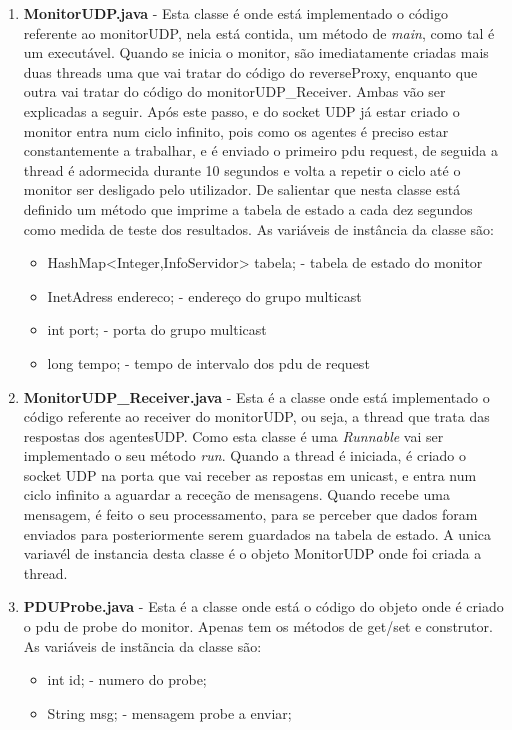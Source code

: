 \documentclass{llncs}
\begin{document}
\begin{enumerate}
				\bigskip
				\item \textbf{MonitorUDP.java} - Esta classe é onde está implementado o código referente ao monitorUDP, nela está contida, um método de \textit{main}, como tal é um executável. Quando se inicia o monitor, são imediatamente criadas mais duas threads uma que vai tratar do código do reverseProxy, enquanto que outra vai tratar do código do monitorUDP\_Receiver. Ambas vão ser explicadas a seguir. Após este passo, e do socket UDP já estar criado o monitor entra num ciclo infinito, pois como os agentes é preciso estar constantemente a trabalhar, e é enviado o primeiro pdu request, de seguida a thread é adormecida durante 10 segundos e volta a repetir o ciclo até o monitor ser desligado pelo utilizador. De salientar que nesta classe está definido um método que imprime a tabela de estado a cada dez segundos como medida de teste dos resultados. As variáveis de instância da classe são:
					\begin{itemize}
						\item{HashMap<Integer,InfoServidor> tabela;} - tabela de estado do monitor
						\item{InetAdress endereco;} - endereço do grupo multicast
						\item{int port;} - porta do grupo multicast
						\item{long tempo;} - tempo de intervalo dos pdu de request
					\end{itemize}

				\bigskip
				\item \textbf{MonitorUDP\_Receiver.java} - Esta é a classe onde está implementado o código referente ao receiver do monitorUDP, ou seja, a thread que trata das respostas dos agentesUDP. Como esta classe é uma \textit{Runnable} vai ser implementado o seu método \textit{run}. Quando a thread é iniciada, é criado o socket UDP na porta que vai receber as repostas em unicast, e entra num ciclo infinito a aguardar a receção de mensagens. Quando recebe uma mensagem, é feito o seu processamento, para se perceber que dados foram enviados para posteriormente serem guardados na tabela de estado.
				A unica variavél de instancia desta classe é o objeto MonitorUDP onde foi criada a thread.

				\bigskip
				\item \textbf{PDUProbe.java} - Esta é a classe onde está o código do objeto onde é criado o pdu de probe do monitor. Apenas tem os métodos de get/set e construtor. As variáveis de instãncia da classe são:
					\begin{itemize}
						\item{int id;} - numero do probe;
						\item{String msg;} - mensagem probe a enviar;
					\end{itemize}


\end{enumerate}
\end{document}

